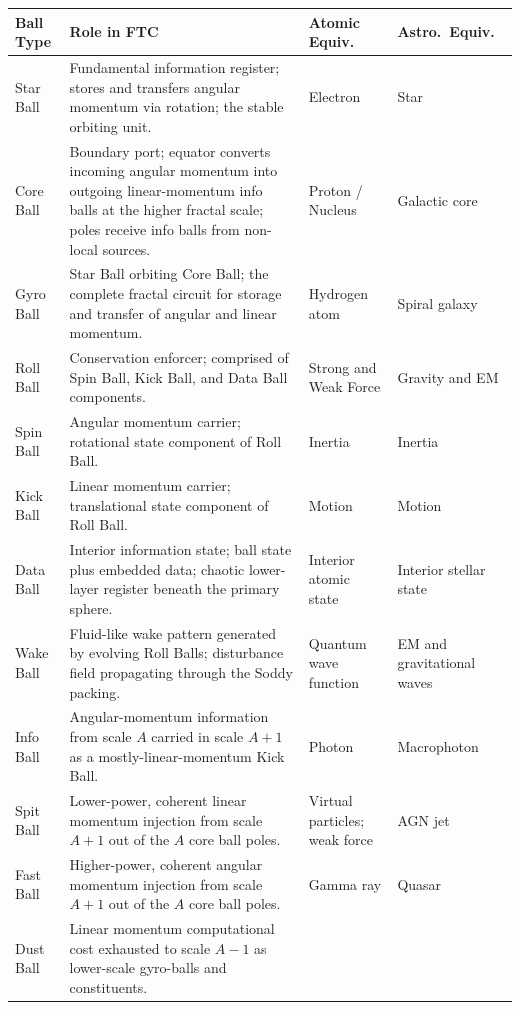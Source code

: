 \documentclass[11pt,a4paper]{article}
\begin{document}
\begin{table}[h]
\centering
\begin{tabular}{|l|p{4.5cm}|p{2cm}|p{2.5cm}|}
\hline
\textbf{Ball Type} & \textbf{Role in FTC} &
  \textbf{Atomic Equiv.} & \textbf{Astro.\ Equiv.} \\
\hline
Star Ball 
& Fundamental information register; stores and transfers angular momentum via rotation; the stable orbiting unit. 
& Electron 
& Star \\
\hline
Core Ball  
& Boundary port; equator converts incoming angular momentum into outgoing linear-momentum info balls at the higher fractal scale; poles receive info balls from non-local sources.
& Proton / Nucleus 
& Galactic core \\
\hline
Gyro Ball  
& Star Ball orbiting Core Ball; the complete fractal circuit for storage and transfer of angular and linear momentum.
& Hydrogen atom 
& Spiral galaxy \\
\hline
Roll Ball  
& Conservation enforcer; comprised of Spin Ball, Kick Ball, and Data Ball components.
& Strong and Weak Force 
& Gravity and EM \\
\hline
Spin Ball  
& Angular momentum carrier; rotational state component of Roll Ball.
& Inertia 
& Inertia \\
\hline
Kick Ball  
  & Linear momentum carrier; translational state component of Roll Ball.
  & Motion 
  & Motion \\
\hline
Data Ball  
  & Interior information state; ball state plus embedded data; chaotic lower-layer register beneath the primary sphere.
  & Interior atomic state 
  & Interior stellar state \\
\hline
Wake Ball  
  & Fluid-like wake pattern generated by evolving Roll Balls; disturbance field propagating through the Soddy packing.
  & Quantum wave function 
  & EM and gravitational waves \\
\hline
Info Ball  
  & Angular-momentum information from scale $A$ carried in scale $A{+}1$ as a mostly-linear-momentum Kick Ball.
  & Photon 
  & Macrophoton \\
\hline
Spit Ball  
  & Lower-power, coherent linear momentum injection from scale $A{+}1$ out of the $A$ core ball poles.
  & Virtual particles; weak force 
  & AGN jet \\
\hline
Fast Ball  
  & Higher-power, coherent angular momentum injection from scale $A{+}1$ out of the $A$ core ball poles.
  & Gamma ray 
  & Quasar \\
\hline
Dust Ball  
  & Linear momentum computational cost exhausted to scale $A{-}1$ as lower-scale gyro-balls and constituents.

\end{tabular}
\end{table}
\end{document}
